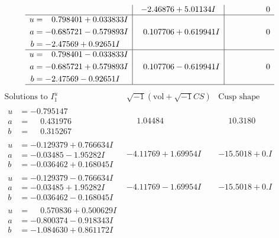 \documentclass[1p]{elsarticle_modified}
\theoremstyle{definition}
\newcommand{\I}{\sqrt{-1}}
\begin{document}
$$\begin{array}{c|c|c}
 & -2.46876 + 5.01134 I & \phantom{-0.000000 } 0 \\ \hline\begin{aligned}
u &= \phantom{-}0.798401 + 0.033833 I \\
a &= -0.685721 - 0.579893 I \\
b &= -2.47569 + 0.92651 I\end{aligned}
 & \phantom{-}0.107706 + 0.619941 I & \phantom{-0.000000 } 0 \\ \hline\begin{aligned}
u &= \phantom{-}0.798401 - 0.033833 I \\
a &= -0.685721 + 0.579893 I \\
b &= -2.47569 - 0.92651 I\end{aligned}
 & \phantom{-}0.107706 - 0.619941 I & \phantom{-0.000000 } 0\\
 \hline 
 \end{array}$$\newpage$$\begin{array}{c|c|c}  
\text{Solutions to }I^u_{1}& \I (\text{vol} + \sqrt{-1}CS) & \text{Cusp shape}\\
 \hline 
\begin{aligned}
u &= -0.795147\phantom{ +0.000000I} \\
a &= \phantom{-}0.431976\phantom{ +0.000000I} \\
b &= \phantom{-}0.315267\phantom{ +0.000000I}\end{aligned}
 & \phantom{-}1.04484\phantom{ +0.000000I} & \phantom{-}10.3180\phantom{ +0.000000I} \\ \hline\begin{aligned}
u &= -0.129379 + 0.766634 I \\
a &= -0.03485 - 1.95282 I \\
b &= -0.036462 + 0.168045 I\end{aligned}
 & -4.11769 + 1.69954 I & -15.5018 + 0. I\phantom{ +0.000000I} \\ \hline\begin{aligned}
u &= -0.129379 - 0.766634 I \\
a &= -0.03485 + 1.95282 I \\
b &= -0.036462 - 0.168045 I\end{aligned}
 & -4.11769 - 1.69954 I & -15.5018 + 0. I\phantom{ +0.000000I} \\ \hline\begin{aligned}
u &= \phantom{-}0.570836 + 0.500629 I \\
a &= -0.800374 - 0.918343 I \\
b &= -1.084630 + 0.861172 I\end{aligned}

\end{array}$$
\end{document}
